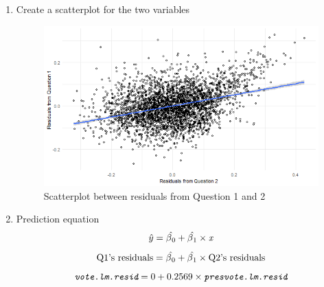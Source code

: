 \documentclass[12pt,letterpaper]{article}
\begin{document}
\begin{enumerate}
		\item Create a scatterplot for the two variables
			
			\begin{figure}[H]\centering
				\caption{\footnotesize Scatterplot between residuals from Question 1 and 2}
				\label{fig:plot_1}
				\includegraphics[width=.85\textwidth]{4.2. Scatter_plot_residuals.png}
			\end{figure}
		
		\item Prediction equation
		$$\hat{y} = \hat{\beta\textsubscript{0}} + \hat{\beta\textsubscript{1}} \times \textit{x} $$
		$$\text{Q1's residuals} = \hat{\beta\textsubscript{0}} + \hat{\beta\textsubscript{1}} \times \text{Q2's residuals} $$
		$$ \textit{\texttt{vote.lm.resid}} = 0 + 0.2569 \times \textit{\texttt{presvote.lm.resid}}$$
	\end{enumerate}
\end{document}
